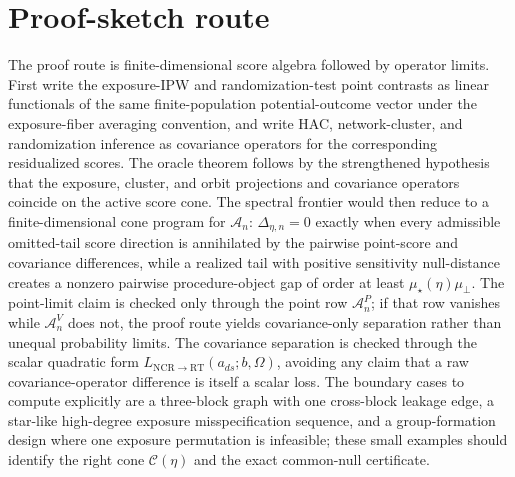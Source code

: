 \documentclass[11pt]{article}
\theoremstyle{definition}
\theoremstyle{plain}
\theoremstyle{remark}
\begin{document}
\section{Proof-sketch route}
The proof route is finite-dimensional score algebra followed by operator
limits.  First write the exposure-IPW and randomization-test point contrasts as
linear functionals of the same finite-population potential-outcome vector under
the exposure-fiber averaging convention, and write HAC, network-cluster, and
randomization inference as covariance operators for the corresponding
residualized scores.  The oracle theorem follows by the strengthened hypothesis
that the exposure, cluster, and orbit projections and covariance operators
coincide on the active score cone.  The spectral frontier would then reduce to a
finite-dimensional cone program for \(\mathcal A_n\):
\(\Delta_{\eta,n}=0\) exactly when every admissible omitted-tail score
direction is annihilated by the pairwise point-score and covariance
differences, while a realized tail with positive sensitivity null-distance
creates a nonzero pairwise procedure-object gap of order at least
\(\mu_\star(\eta)\mu_{\perp}\).  The point-limit claim is checked only through
the point row \(\mathcal A^P_n\); if that row vanishes while
\(\mathcal A^V_n\) does not, the proof route yields covariance-only
separation rather than unequal probability limits.  The covariance separation
is checked through the scalar quadratic form
\(L_{\mathrm{NCR}\to\mathrm{RT}}(a_{ds};b,\Omega)\), avoiding any claim that a
raw covariance-operator difference is itself a scalar loss.  The boundary
cases to compute explicitly are a
three-block graph with one cross-block leakage edge, a star-like high-degree
exposure misspecification sequence, and a group-formation design where one
exposure permutation is infeasible; these small examples should identify the
right cone \(\mathcal C(\eta)\) and the exact common-null certificate.
\end{document}
